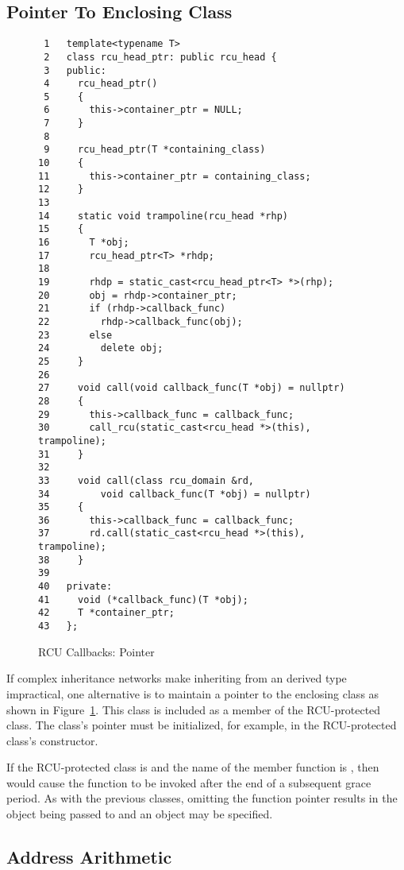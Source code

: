 \documentclass[letterpaper,twocolumn,10pt]{article}
\begin{document}
\subsection{Pointer To Enclosing Class}
\label{sec:Pointer To Enclosing Class}

\begin{figure}[tbp]
{ \scriptsize
\begin{verbatim}
 1   template<typename T>
 2   class rcu_head_ptr: public rcu_head {
 3   public:
 4     rcu_head_ptr()
 5     {
 6       this->container_ptr = NULL;
 7     }
 8
 9     rcu_head_ptr(T *containing_class)
10     {
11       this->container_ptr = containing_class;
12     }
13
14     static void trampoline(rcu_head *rhp)
15     {
16       T *obj;
17       rcu_head_ptr<T> *rhdp;
18
19       rhdp = static_cast<rcu_head_ptr<T> *>(rhp);
20       obj = rhdp->container_ptr;
21       if (rhdp->callback_func)
22         rhdp->callback_func(obj);
23       else
24         delete obj;
25     }
26
27     void call(void callback_func(T *obj) = nullptr)
28     {
29       this->callback_func = callback_func;
30       call_rcu(static_cast<rcu_head *>(this), trampoline);
31     }
32
33     void call(class rcu_domain &rd,
34         void callback_func(T *obj) = nullptr)
35     {
36       this->callback_func = callback_func;
37       rd.call(static_cast<rcu_head *>(this), trampoline);
38     }
39
40   private:
41     void (*callback_func)(T *obj);
42     T *container_ptr;
43   };
\end{verbatim}
}
\caption{RCU Callbacks: Pointer}
\label{fig:RCU Callbacks: Pointer}
\end{figure}

If complex inheritance networks make inheriting from an
 derived type impractical, one alternative is
to maintain a pointer to the enclosing class as shown in
Figure~\ref{fig:RCU Callbacks: Pointer}.
This  class is included as a member of the RCU-protected
class.
The  class's pointer must be initialized, for example,
in the RCU-protected class's constructor.

If the RCU-protected class is  and the name of the
 member function is , then
 would cause the function  to be
invoked after the end of a subsequent grace period.
As with the previous classes, omitting the function pointer results
in the object being passed to  and an 
object may be specified.

\subsection{Address Arithmetic}
\label{sec:Address Arithmetic}
\end{document}
